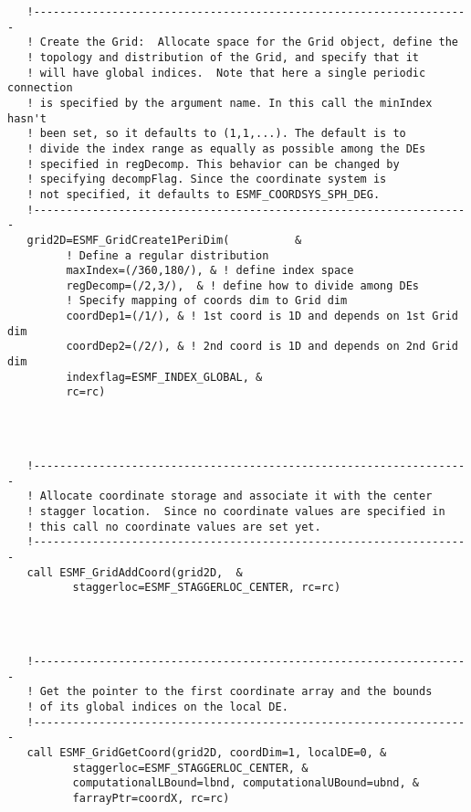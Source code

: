 
 \begin{verbatim}
   !-------------------------------------------------------------------
   ! Create the Grid:  Allocate space for the Grid object, define the
   ! topology and distribution of the Grid, and specify that it
   ! will have global indices.  Note that here a single periodic connection
   ! is specified by the argument name. In this call the minIndex hasn't
   ! been set, so it defaults to (1,1,...). The default is to
   ! divide the index range as equally as possible among the DEs
   ! specified in regDecomp. This behavior can be changed by
   ! specifying decompFlag. Since the coordinate system is
   ! not specified, it defaults to ESMF_COORDSYS_SPH_DEG.
   !-------------------------------------------------------------------
   grid2D=ESMF_GridCreate1PeriDim(          &
         ! Define a regular distribution
         maxIndex=(/360,180/), & ! define index space
         regDecomp=(/2,3/),  & ! define how to divide among DEs
         ! Specify mapping of coords dim to Grid dim
         coordDep1=(/1/), & ! 1st coord is 1D and depends on 1st Grid dim
         coordDep2=(/2/), & ! 2nd coord is 1D and depends on 2nd Grid dim
         indexflag=ESMF_INDEX_GLOBAL, &
         rc=rc)
 
\end{verbatim}
 

 \begin{verbatim}


   !-------------------------------------------------------------------
   ! Allocate coordinate storage and associate it with the center
   ! stagger location.  Since no coordinate values are specified in
   ! this call no coordinate values are set yet.
   !-------------------------------------------------------------------
   call ESMF_GridAddCoord(grid2D,  &
          staggerloc=ESMF_STAGGERLOC_CENTER, rc=rc)

 
\end{verbatim}
 

 \begin{verbatim}

   !-------------------------------------------------------------------
   ! Get the pointer to the first coordinate array and the bounds
   ! of its global indices on the local DE.
   !-------------------------------------------------------------------
   call ESMF_GridGetCoord(grid2D, coordDim=1, localDE=0, &
          staggerloc=ESMF_STAGGERLOC_CENTER, &
          computationalLBound=lbnd, computationalUBound=ubnd, &
          farrayPtr=coordX, rc=rc)
 
\end{verbatim}
 
